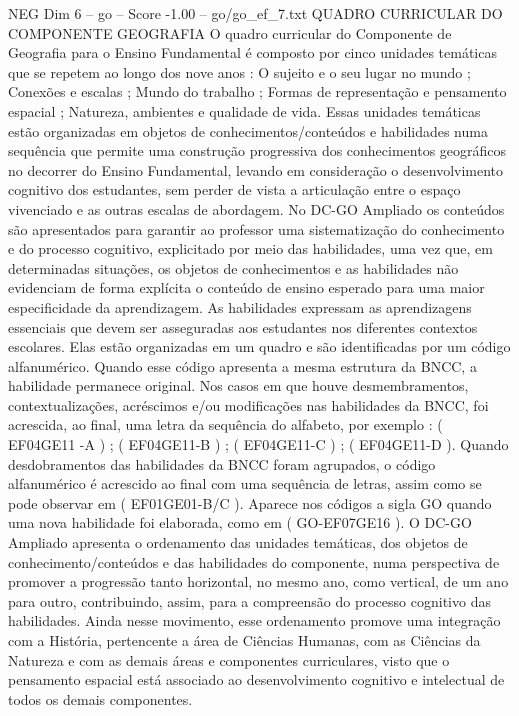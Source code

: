 \begin{textsample}{NEG Dim 6 – go – Score -1.00 – go/go\_ef\_7.txt}  \label{ex:f6_neg_175}
QUADRO CURRICULAR DO COMPONENTE GEOGRAFIA O quadro curricular do Componente de Geografia para o Ensino Fundamental é composto por cinco unidades temáticas que se repetem ao longo dos nove anos : O sujeito e o seu lugar no mundo ; Conexões e escalas ; Mundo do trabalho ; Formas de representação e pensamento espacial ; Natureza, ambientes e qualidade de vida.
Essas unidades temáticas estão organizadas em objetos de conhecimentos/conteúdos e habilidades numa sequência que permite uma construção progressiva dos conhecimentos geográficos no decorrer do Ensino Fundamental, levando em consideração o desenvolvimento cognitivo dos estudantes, sem perder de vista a articulação entre o espaço vivenciado e as outras escalas de abordagem.
No DC-GO Ampliado os conteúdos são apresentados para garantir ao professor uma sistematização do conhecimento e do processo cognitivo, explicitado por meio das habilidades, uma vez que, em determinadas situações, os objetos de conhecimentos e as habilidades não evidenciam de forma explícita o conteúdo de ensino esperado para uma maior especificidade da aprendizagem.
As habilidades expressam as aprendizagens essenciais que devem ser asseguradas aos estudantes nos diferentes contextos escolares.
Elas estão organizadas em um quadro e são identificadas por um código alfanumérico.
Quando esse código apresenta a mesma estrutura da BNCC, a habilidade permanece original.
Nos casos em que houve desmembramentos, contextualizações, acréscimos e/ou modificações nas habilidades da BNCC, foi acrescida, ao final, uma letra da sequência do alfabeto, por exemplo : ( EF04GE11 -A ) ; ( EF04GE11-B ) ; ( EF04GE11-C ) ; ( EF04GE11-D ).
Quando desdobramentos das habilidades da BNCC foram agrupados, o código alfanumérico é acrescido ao final com uma sequência de letras, assim como se pode observar em ( EF01GE01-B/C ).
Aparece nos códigos a sigla GO quando uma nova habilidade foi elaborada, como em ( GO-EF07GE16 ).
O DC-GO Ampliado apresenta o ordenamento das unidades temáticas, dos objetos de conhecimento/conteúdos e das habilidades do componente, numa perspectiva de promover a progressão tanto horizontal, no mesmo ano, como vertical, de um ano para outro, contribuindo, assim, para a compreensão do processo cognitivo das habilidades.
Ainda nesse movimento, esse ordenamento promove uma integração com a História, pertencente a área de Ciências Humanas, com as Ciências da Natureza e com as demais áreas e componentes curriculares, visto que o pensamento espacial está associado ao desenvolvimento cognitivo e intelectual de todos os demais componentes.

\end{textsample}
